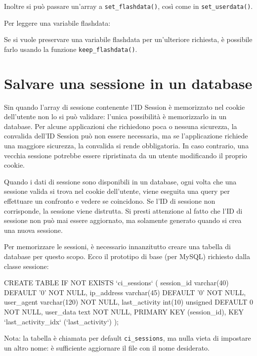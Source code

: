 Inoltre si può passare un'array a \verb|set_flashdata()|, così come in \verb|set_userdata()|.

Per leggere una variabile flashdata:


Se si vuole preservare una variabile flashdata per un'ulteriore richiesta, è possibile farlo usando la funzione \verb|keep_flashdata()|.

\section*{Salvare una sessione in un database}

Sin quando l'array di sessione contenente l'ID Session è memorizzato nel cookie dell'utente non lo si può validare: l'unica possibilità è memorizzarlo in un database. Per alcune applicazioni che richiedono poca o nessuna sicurezza, la convalida dell'ID Session può non essere necessaria, ma se l'applicazione richiede una maggiore sicurezza, la convalida si rende obbligatoria. In caso contrario, una vecchia sessione potrebbe essere ripristinata da un utente modificando il proprio cookie.

Quando i dati di sessione sono disponibili in un database, ogni volta che una sessione valida si trova nel cookie dell'utente, viene eseguita una query per effettuare un confronto e vedere se coincidono. Se l'ID di sessione non corrisponde, la sessione viene distrutta. Si presti attenzione al fatto che l'ID di sessione non può mai essere aggiornato, ma solamente generato quando si crea una nuova sessione.

Per memorizzare le sessioni, è necessario innanzitutto creare una tabella di database per questo scopo. Ecco il prototipo di base (per MySQL) richiesto dalla classe sessione:

\begin{code}
CREATE TABLE IF NOT EXISTS  `ci_sessions` (
	session_id varchar(40) DEFAULT '0' NOT NULL,
	ip_address varchar(45) DEFAULT '0' NOT NULL,
	user_agent varchar(120) NOT NULL,
	last_activity int(10) unsigned DEFAULT 0 NOT NULL,
	user_data text NOT NULL,
	PRIMARY KEY (session_id),
	KEY `last_activity_idx` (`last_activity`)
);
\end{code}

Nota: la tabella è chiamata per default \verb|ci_sessions|, ma nulla vieta di impostare un altro nome: è sufficiente aggiornare il file  con il nome desiderato.

